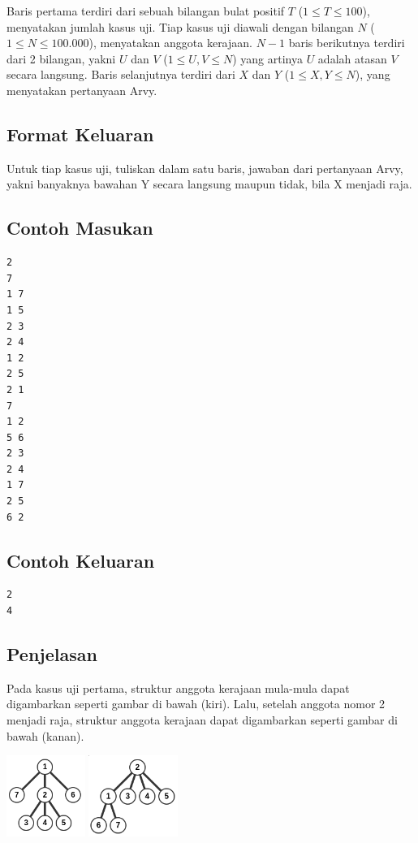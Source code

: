 \documentclass{article}
\begin{document}
Baris pertama terdiri dari sebuah bilangan bulat positif $T$ ($1 \leq T \leq 100$), menyatakan jumlah kasus uji.
Tiap kasus uji diawali dengan bilangan $N$ ($1 \leq N \leq 100.000$), menyatakan anggota kerajaan.
$N - 1$ baris berikutnya terdiri dari 2 bilangan, yakni $U$ dan $V$ ($1 \leq U, V \leq N$) yang artinya $U$ adalah atasan $V$ secara langsung.
Baris selanjutnya terdiri dari $X$ dan $Y$ ($1 \leq X, Y \leq N$), yang menyatakan pertanyaan Arvy.

\subsection*{Format Keluaran}

Untuk tiap kasus uji, tuliskan dalam satu baris, jawaban dari pertanyaan Arvy, yakni banyaknya bawahan Y secara langsung maupun tidak, bila X menjadi raja.
\\

\begin{multicols}{2}
\subsection*{Contoh Masukan}
\begin{lstlisting}
2
7
1 7
1 5
2 3
2 4
1 2
2 5
2 1
7
1 2
5 6
2 3
2 4
1 7
2 5
6 2
\end{lstlisting}
\columnbreak
\subsection*{Contoh Keluaran}
\begin{lstlisting}
2
4
\end{lstlisting}
\vfill
\null
\end{multicols}

\pagebreak

\subsection*{Penjelasan}
Pada kasus uji pertama, struktur anggota kerajaan mula-mula dapat digambarkan seperti gambar di bawah (kiri). Lalu, setelah anggota nomor 2 menjadi raja, struktur anggota kerajaan dapat digambarkan seperti gambar di bawah (kanan).

\includegraphics[height=100px]{sample-1-1}
\includegraphics[height=100px]{sample-1-2}
\end{document}

